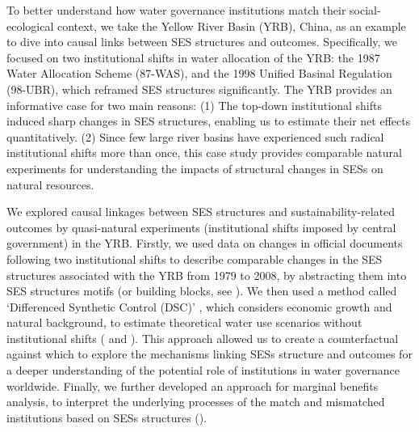 To better understand how water governance institutions match their social-ecological context, we take the Yellow River Basin (YRB), China, as an example \textit{} to dive into causal links between SES structures and outcomes.
Specifically, we focused on two institutional shifts in water allocation of the YRB: the 1987 Water Allocation Scheme (87-WAS), and the 1998 Unified Basinal Regulation (98-UBR), which reframed SES structures significantly.
The YRB provides an informative case for two main reasons:
(1) The top-down institutional shifts induced sharp changes in SES structures, enabling us to estimate their net effects quantitatively.
(2) Since few large river basins have experienced such radical institutional shifts more than once, this case study provides comparable natural experiments for understanding the impacts of structural changes in SESs on natural resources.

We explored causal linkages between SES structures and sustainability-related outcomes by quasi-natural experiments (institutional shifts imposed by central government) in the YRB.
Firstly, we used data on changes in official documents following two institutional shifts to describe comparable changes in the SES structures associated with the YRB from 1979 to 2008, by abstracting them into SES structures motifs (or building blocks, see \textit{}).
We then used a method called `Differenced Synthetic Control (DSC)' \cite{arkhangelsky2021}, which considers economic growth and natural background, to estimate theoretical water use scenarios without institutional shifts (\textit{} and \textit{}).
This approach allowed us to create a counterfactual against which to explore the mechanisms linking SESs structure and outcomes for a deeper understanding of the potential role of institutions in water governance worldwide.
Finally, we further developed an approach for marginal benefits analysis, to interpret the underlying processes of the match and mismatched institutions based on SESs structures (\textit{}).
